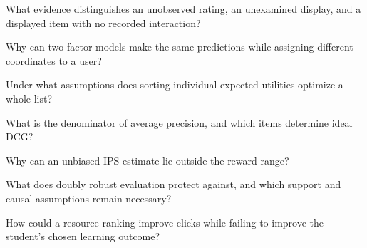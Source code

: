 \begin{studyquestions}
\item What evidence distinguishes an unobserved rating, an unexamined display, and a displayed item with no recorded interaction?
\item Why can two factor models make the same predictions while assigning different coordinates to a user?
\item Under what assumptions does sorting individual expected utilities optimize a whole list?
\item What is the denominator of average precision, and which items determine ideal DCG?
\item Why can an unbiased IPS estimate lie outside the reward range?
\item What does doubly robust evaluation protect against, and which support and causal assumptions remain necessary?
\item How could a resource ranking improve clicks while failing to improve the student's chosen learning outcome?
\end{studyquestions}

